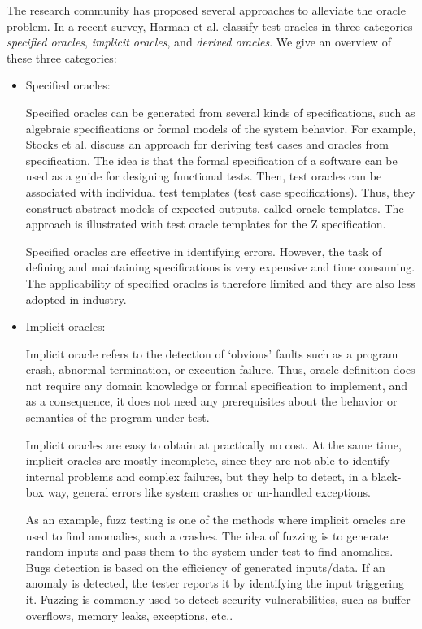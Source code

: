 The research community has proposed several approaches\cite{harman2013comprehensive,barr2015oracle} to alleviate the oracle problem. 
In a recent survey, Harman et al.\cite{harman2013comprehensive} classify test oracles in three categories \textit{specified oracles}, \textit{implicit oracles}, and \textit{derived oracles}. We give an overview of these three categories:
\begin{itemize}
	\item Specified oracles:
	
	Specified oracles can be generated from several kinds of specifications, such as algebraic specifications or formal models of the system behavior. 
	For example, Stocks et al.\cite{stocks1996framework,richardson1992specification} discuss an approach for deriving test cases and oracles from specification. The idea is that the formal specification of a software can be used as a guide for designing functional tests. Then, test oracles can be associated with individual test templates (test case specifications). Thus, they construct abstract models of expected outputs, called oracle templates. 
	The approach is illustrated with test oracle templates for the Z specification.
	
	Specified oracles are effective in identifying errors. However, the task of defining and maintaining specifications is very expensive and time consuming. The applicability of specified oracles is therefore limited and they are also less adopted in industry.
	
	\item Implicit oracles:
	
	Implicit oracle refers to the detection of ‘obvious’ faults such as a program crash, abnormal termination, or execution failure.
	Thus, oracle definition does not require any domain knowledge or formal specification to implement, and as a consequence, it does not need any prerequisites about the behavior or semantics of the program under test.
	
	Implicit oracles\cite{harman2013comprehensive,barr2015oracle} are easy to obtain at practically no cost. At the same time, implicit oracles are mostly incomplete, since they are not able to identify internal problems and complex failures, but they help to detect, in a black-box way, general errors like system crashes or un-handled exceptions.
	
	As an example, fuzz testing\cite{miller1990empirical} is one of the methods where implicit oracles are used to find anomalies, such a crashes. The idea of fuzzing is to generate random inputs and pass them to the system under test to find anomalies.
	Bugs detection is based on the efficiency of generated inputs/data. If an anomaly is detected, the tester reports it by identifying the input triggering it. 
	Fuzzing is commonly used to detect security vulnerabilities, such as buffer overflows, memory leaks, exceptions, etc.\cite{bekrar2011finding}.
	

\end{itemize}
